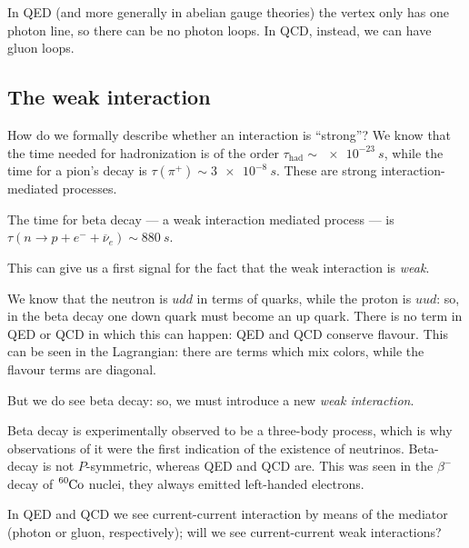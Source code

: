 \documentclass[main.tex]{subfiles}
\begin{document}
In QED (and more generally in abelian gauge theories) the vertex only has one photon line, so there can be no photon loops. 
In QCD, instead, we can have gluon loops.

\subsection{The weak interaction}

How do we formally describe whether an interaction is ``strong''?
We know that the time needed for hadronization  is of the order \(\tau _{\text{had}} \sim \SI{e-23}{s}\), while the time for a pion's decay is \(\tau (\pi^{+}) \sim \SI{3e-8}{s}\). These are strong interaction-mediated processes.

The time for beta decay --- a weak interaction mediated process --- is \(\tau (n \to p + e^{-} + \overline{\nu}_{e}) \sim \SI{880}{s}\). 

This can give us a first signal for the fact that the weak interaction is \emph{weak}. 

We know that the neutron is \(u d d \) in terms of quarks, while the proton is \(u u d\): so, in the beta decay one down quark must become an up quark. 
There is no term in QED or QCD in which this can happen: QED and QCD conserve flavour. This can be seen in the Lagrangian: there are terms which mix colors, while the flavour terms are diagonal. 

But we do see beta decay: so, we must introduce a new \emph{weak interaction}.

Beta decay is experimentally observed to be a three-body process, which is why observations of it were the first indication of the existence of neutrinos. 
Beta-decay is not \(P\)-symmetric, whereas QED and QCD are.
This was seen in the \(\beta^{-}\) decay of \(\ce{^{60}Co}\) nuclei, they always emitted left-handed electrons.

In QED and QCD we see current-current interaction by means of the mediator (photon or gluon, respectively); will we see current-current weak interactions? 

\end{document}
